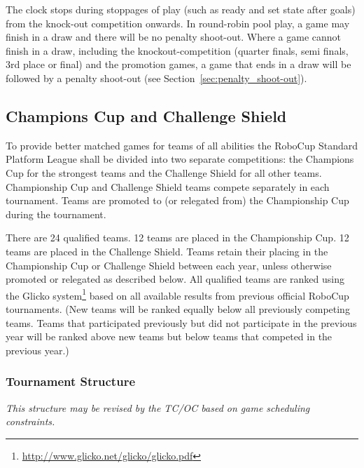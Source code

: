The clock stops during stoppages of play (such as ready and set state after goals) from the knock-out competition onwards.  In round-robin pool play, a game may finish in a draw and there will be no penalty shoot-out. Where a game cannot finish in a draw, including the knockout-competition (quarter finals, semi finals, 3rd place or final) and the promotion games, a game that ends in a draw will be followed by a penalty shoot-out (see Section~\ref{sec:penalty_shoot-out}).

\subsection{Champions Cup and Challenge Shield}
\label{sec:twoCompetitions}

To provide better matched games for teams of all abilities the RoboCup Standard Platform League shall be divided into two separate competitions: the Champions Cup for the strongest teams and the Challenge Shield for all other teams. Championship Cup and Challenge Shield teams compete separately in each tournament. Teams are promoted to (or relegated from) the Championship Cup during the tournament. 

There are 24 qualified teams. 12 teams are placed in the Championship Cup. 12 teams are placed in the Challenge Shield. Teams retain their placing in the Championship Cup or Challenge Shield between each year, unless otherwise promoted or relegated as described below. 
All qualified teams are ranked using the Glicko system\footnote{\url{http://www.glicko.net/glicko/glicko.pdf}} based on all available results from previous official RoboCup tournaments. (New teams will be ranked equally below all previously competing teams. Teams that participated previously but did not participate in the previous year will be ranked above new teams but below teams that competed in the previous year.)

\subsubsection{Tournament Structure}
\emph{This structure may be revised by the TC/OC based on game scheduling constraints.} 

